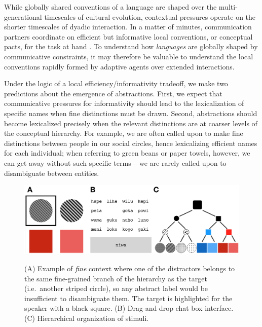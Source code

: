 \documentclass[10pt,letterpaper]{article}
\begin{document}
While globally shared conventions of a language are shaped over the multi-generational timescales of cultural evolution, contextual pressures operate on the shorter timescales of dyadic interaction. 
In a matter of minutes, communication partners coordinate on efficient but informative local conventions, or conceptual pacts, for the task at hand \cite{ClarkWilkesGibbs86_ReferringCollaborative, BrennanClark96_ConceptualPactsConversation,HawkinsFrankGoodman17_ConventionFormation}. 
To understand how \emph{languages} are globally shaped by communicative constraints, it may therefore be valuable to understand the local conventions rapidly formed by adaptive agents over extended interactions.

Under the logic of a local efficiency/informativity tradeoff, we make two predictions about the emergence of abstractions. First, we expect that communicative pressures for informativity should lead to the lexicalization of specific names when fine distinctions must be drawn. Second, abstractions should become lexicalized precisely when the relevant distinctions are at coarser levels of the conceptual hierarchy. 
For example, we are often called upon to make fine distinctions between people in our social circles, hence lexicalizing efficient names for each individual; when referring to green beans or paper towels, however, we can get away without such specific terms -- we are rarely called upon to disambiguate between entities. %

\begin{figure}[t]
\begin{center}
{\includegraphics[scale=.65]{fig.png}}
{\caption{{(A) Example of \emph{fine} context where one of the distractors belongs to the same fine-grained branch of the hierarchy as the target (i.e.\ another striped circle), so any abstract label would be insufficient to disambiguate them. The target is highlighted for the speaker with a black square. (B) Drag-and-drop chat box interface. (C) Hierarchical organization of stimuli.\label{exp}}}}
\end{center}
\end{figure}
\end{document}
